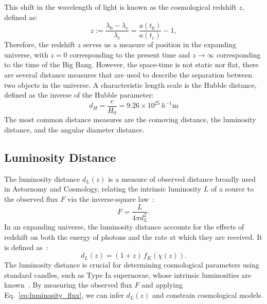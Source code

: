 This shift in the wavelength of light is known as the cosmological redshift \( z \), defined as:
\begin{equation}
    z := \frac{\lambda_0 - \lambda_e}{\lambda_e} = \frac{a(t_0)}{a(t_e)} - 1,
    \label{eq:redshift_definition_2}
\end{equation}
Therefore, the redshift $z$ serves us a measure of position in the expanding universe, with $z = 0$ corresponding to the present time and $z \to \infty$ corresponding to the time of the Big Bang. However, the space-time is not static nor flat, there are several distance measures that are used to describe the separation between two objects in the universe. 
A characteristic length scale is the Hubble distance, defined as the inverse of the Hubble parameter:
\begin{equation}
    d_H = \frac{c}{H_0} = 9.26 \times 10^{25} \, h^{-1}\text{m} 
    \label{eq:hubble_distance}
\end{equation}
The most common distance measures are the comoving distance, the luminosity distance, and the angular diameter distance.

\subsection{Luminosity Distance}
The luminosity distance \( d_L(z) \) is a measure of observed distance broadly used in Astornomy and Cosmology, relating the intrinsic luminosity \( L \) of a source to the observed flux \( F \) via the inverse-square law~\citep{1992ARA&A..30..499C}:
\begin{equation}
    F = \frac{L}{4\pi d_L^2}.
    \label{eq:luminosity_flux}
\end{equation}
In an expanding universe, the luminosity distance accounts for the effects of redshift on both the energy of photons and the rate at which they are received. It is defined as~\citep{1999astro.ph..5116H}:
\begin{equation}
    d_L(z) = (1 + z) \, f_K(\chi(z)).
    \label{eq:luminosity_distance}
\end{equation}
The luminosity distance is crucial for determining cosmological parameters using standard candles, such as Type Ia supernovae, whose intrinsic luminosities are known~\citep{1998AJ....116.1009R}. By measuring the observed flux \( F \) and applying Eq.~\eqref{eq:luminosity_flux}, we can infer \( d_L(z) \) and constrain cosmological models.


